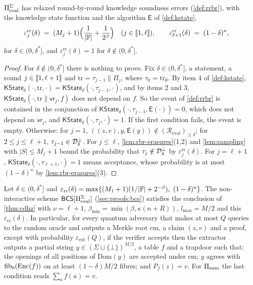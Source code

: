 \begin{theorem}\label{thm:rrbr}
$\Pi_{\mathrm{eval}}^{\Sigma}$ has relaxed round-by-round knowledge soundness errors (\cref{def:rrbr}), with the knowledge state function and the algorithm $\mathsf{E}$ of \cref{def:kstate},
\[
  \varepsilon^{\mathrm{rr}}_j(\delta) \;=\; (M_j + 1)\Bigl(\frac{1}{|\mathbb{F}|} + \frac{1}{2^\beta}\Bigr) \quad (j \in \llbracket 1, \ell \rrbracket), \qquad \varepsilon^{\mathrm{rr}}_{\ell+1}(\delta) \;=\; (1-\delta)^{\kappa},
\]
for $\delta \in (0, \delta^*]$, and $\varepsilon^{\mathrm{rr}}_j(\delta) = 1$ for $\delta \notin (0, \delta^*]$.
\end{theorem}

\begin{proof}
For $\delta \notin (0,\delta^*]$ there is nothing to prove. Fix $\delta \in (0,\delta^*]$, a statement, a round $j \in \llbracket 1, \ell+1 \rrbracket$ and $\mathrm{tr} = \tau_{j-1} \| \Pi_j$, where $\tau_0 = \mathrm{tr}_\emptyset$.
By item 4 of \cref{def:kstate}, $\mathsf{KState}_\delta(\cdot, \mathrm{tr}, \cdot) = \mathsf{KState}_\delta(\cdot, \tau_{j-1}, \cdot)$, and by items 2 and 3, $\mathsf{KState}_\delta(\cdot, \mathrm{tr}\|\mathsf{vr}_j, f)$ does not depend on $f$.
So the event of \cref{def:rrbr} is contained in the conjunction of $\mathsf{KState}_\delta(\cdot, \tau_{j-1}, \mathsf{E}(\cdot)) = 0$, which does not depend on $\mathsf{vr}_j$, and $\mathsf{KState}_\delta(\cdot, \tau_j, \cdot) = 1$.
If the first condition fails, the event is empty. Otherwise:
for $j = 1$, $((z,v), y, \mathsf{E}(y)) \notin (\mathcal{R}_{\mathrm{eval}})_{\le\delta}$; for $2 \le j \le \ell+1$, $\tau_{j-1} \in \mathcal{D}^{\bot}_\delta$.
For $j \le \ell$, \cref{lem:rbr-erasures}(1,2) and \cref{lem:sampling} with $|S| \le M_j + 1$ bound the probability that $\tau_j \notin \mathcal{D}^{\bot}_\delta$ by $\varepsilon^{\mathrm{rr}}_j(\delta)$.
For $j = \ell+1$, $\mathsf{KState}_\delta(\cdot, \tau_{\ell+1}, \cdot) = 1$ means acceptance, whose probability is at most $(1-\delta)^\kappa$ by \cref{lem:rbr-erasures}(3).
\end{proof}

\begin{corollary}\label{cor:pq}
Let $\delta \in (0,\delta^*]$ and $\varepsilon_{\mathrm{rr}}(\delta) = \max\{(M_1+1)(1/|\mathbb{F}| + 2^{-\beta}),\ (1-\delta)^{\kappa}\}$.
The non-interactive scheme $\mathsf{BCS}[\Pi_{\mathrm{eval}}^{\Sigma}]$ (\cref{sec:proofs:bcs}) satisfies the conclusion of \cref{thm:cdhz} with $\nu = \ell + 1$, $\beta_{\min} = \min(\beta, \kappa(n+R))$, $l_{\max} = M/2$ and this $\varepsilon_{\mathrm{rr}}(\delta)$.
In particular, for every quantum adversary that makes at most $Q$ queries to the random oracle and outputs a Merkle root $\mathrm{cm}$, a claim $(z, v)$ and a proof, except with probability $\varepsilon_{\mathrm{ext}}(Q)$, if the verifier accepts then the extractor outputs a partial string $y \in (\Sigma \sqcup \{\bot\})^{M/2}$, a table $f$ and a trapdoor such that:
the openings of all positions of $\mathrm{Dom}(y)$ are accepted under $\mathrm{cm}$; $y$ agrees with $\mathrm{fib}_0(\mathrm{Enc}(f))$ on at least $(1-\delta)M/2$ fibres; and $P_f(z) = v$.
For $\Pi_{\mathrm{sum}}$ the last condition reads $\sum_a f(a) = v$.
\end{corollary}

